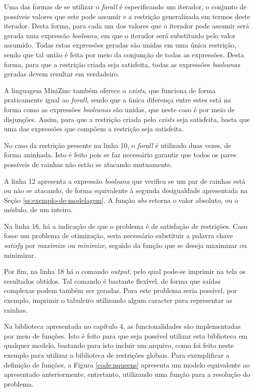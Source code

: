 Uma das formas de se utilizar o \textit{forall} é especificando um iterador, o conjunto de possíveis valores que este pode assumir e a restrição generalizada em termos deste iterador. Desta forma, para cada um dos valores que o iterador pode assumir será gerada uma expressão \textit{booleana}, em que o iterador será substituido pelo valor assumido. Todas estas expressões geradas são unidas em uma única restrição, sendo que tal união é feita por meio da conjunção de todas as expressões. Desta forma, para que a restrição criada seja satisfeita, todas as expressões \textit{booleanas} geradas devem resultar em verdadeiro.

A linguagem MiniZinc também oferece o \textit{exists}, que funciona de forma praticamente igual ao \textit{forall}, sendo que a única diferença entre estes está na forma como as expressões \textit{booleanas} são unidas, que neste caso é por meio de disjunções. Assim, para que a restrição criada pelo \textit{exists} seja satisfeita, basta que uma das expressões que compõem a restrição seja satisfeita.

No caso da restrição presente na linha 10, o \textit{forall} é utilizado duas vezes, de forma aninhada. Isto é feito pois se faz necessário garantir que todos os pares possíveis de rainhas não estão se atacando mutuamente.

A linha 12 apresenta a expressão \textit{booleana} que verifica se um par de rainhas está ou não se atacando, de forma equivalente à segunda desigualdade apresentada na Seção \ref{ss:exemplo-de-modelagem}. A função \textit{abs} retorna o valor absoluto, ou o módulo, de um inteiro.

Na linha 16, há a indicação de que o problema é de satisfação de restrições. Caso fosse um problema de otimização, seria necessário substituir a palavra chave \textit{satisfy} por \textit{maximize} ou \textit{minimize}, seguido da função que se deseja maximizar ou minimizar.

Por fim, na linha 18 há o comando \textit{output}, pelo qual pode-se imprimir na tela os resultados obtidos. Tal comando é bastante flexível, de forma que saídas complexas podem também ser geradas. Para este problema seria possível, por exemplo, imprimir o tabuleiro utilizando algum caracter para representar as rainhas.

Na biblioteca apresentada no capítulo 4, as funcionalidades são implementadas por meio de funções. Isto é feito para que seja possível utilizar esta biblioteca em qualquer modelo, bastando para isto incluir um arquivo, como foi feito neste exemplo para utilizar a biblioteca de restrições globais. Para exemplificar a definição de funções, a Figura \ref{code:nqueens} apresenta um modelo equivalente ao apresentado anteriormente, entretanto, utilizando uma função para a resolução do problema.

